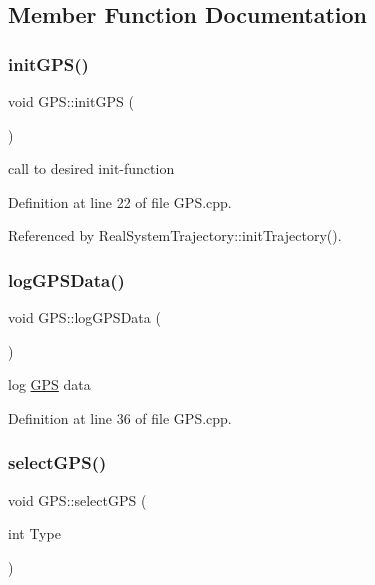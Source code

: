 \subsection{Member Function Documentation}
\mbox{\label{class_g_p_s_a0775b2666962335df5945d3d9b1a3188}} 
\subsubsection{\texorpdfstring{init\+G\+P\+S()}{initGPS()}}
{\footnotesize\ttfamily void G\+P\+S\+::init\+G\+PS (\begin{DoxyParamCaption}{ }\end{DoxyParamCaption})}



call to desired init-\/function 



Definition at line 22 of file G\+P\+S.\+cpp.



Referenced by Real\+System\+Trajectory\+::init\+Trajectory().

\mbox{\label{class_g_p_s_a36cf39646fc821e0061b010543625e2f}} 
\subsubsection{\texorpdfstring{log\+G\+P\+S\+Data()}{logGPSData()}}
{\footnotesize\ttfamily void G\+P\+S\+::log\+G\+P\+S\+Data (\begin{DoxyParamCaption}{ }\end{DoxyParamCaption})}



log \hyperlink{class_g_p_s}{G\+PS} data 



Definition at line 36 of file G\+P\+S.\+cpp.

\mbox{\label{class_g_p_s_a0c87197e52afcfd706407ef06e099f00}} 
\subsubsection{\texorpdfstring{select\+G\+P\+S()}{selectGPS()}}
{\footnotesize\ttfamily void G\+P\+S\+::select\+G\+PS (\begin{DoxyParamCaption}\item[{int}]{Type }\end{DoxyParamCaption})}



